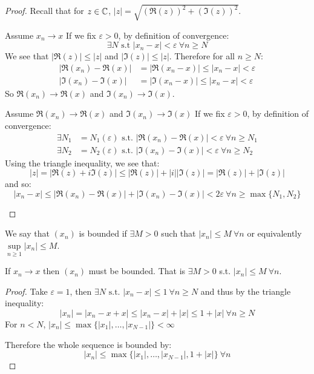 \documentclass[../main.tex]{subfiles}
\begin{document}
\begin{proof}
  Recall that for $z \in \mathbb{C}$, $|z| = \sqrt{(\Re(z))^2 + (\Im(z))^2}$.
  \begin{proofdirection}{Assume $x_n \to x$}
    If we fix $\varepsilon > 0$, by definition of convergence:
    \[
      \exists N \text{ s.t } |x_n - x| < \varepsilon\ \forall n \geq N
    \]
    We see that $|\Re(z)| \leq |z|$ and $|\Im(z)| \leq |z|$.
    Therefore for all $n \geq N$:
    \begin{align*}
      |\Re(x_n) - \Re(x)| &= |\Re(x_n - x)| \leq |x_n - x| < \varepsilon \\
      |\Im(x_n) - \Im(x)| &= |\Im(x_n - x)| \leq |x_n - x| < \varepsilon
    \end{align*}
    So $\Re(x_n) \to \Re(x)$ and $\Im(x_n) \to \Im(x)$.
  \end{proofdirection}
  \begin{proofdirection}{Assume $\Re(x_n) \to \Re(x)$ and $\Im(x_n) \to \Im(x)$}
    If we fix $\varepsilon > 0$, by definition of convergence:
    \begin{align*}
      \exists N_1 &= N_1(\varepsilon) \text{ s.t. } |\Re(x_n) - \Re(x)| < \varepsilon\ \forall n \geq N_1 \\
      \exists N_2 &= N_2(\varepsilon) \text{ s.t. } |\Im(x_n) - \Im(x)| < \varepsilon\ \forall n \geq N_2
    \end{align*}
    Using the triangle inequality, we see that:
    \[
      |z| = |\Re(z) + i \Im(z)| \leq |\Re(z)| + |i||\Im(z)| = |\Re(z)| + |\Im(z)|
    \]
    and so:
    \[
      |x_n - x| \leq |\Re(x_n) - \Re(x)| + |\Im(x_n) - \Im(x)| < 2\varepsilon\ \forall n \geq \max\{N_1, N_2\}
    \]
  \end{proofdirection}
\end{proof}
\begin{definition}
  We say that $(x_n)$ is bounded if $\exists M > 0$ such that $|x_n| \leq M\ \forall n$ or equivalently $\sup\limits_{n \geq 1} |x_n| \leq M$.
\end{definition}
\begin{lemma}
  If $x_n \to x$ then $(x_n)$ must be bounded.
  That is $\exists M > 0$ s.t. $|x_n| \leq M\ \forall n$.
  \label{convergenceBounded}
\end{lemma}
\begin{proof}
  Take $\varepsilon = 1$, then $\exists N \text{ s.t. } |x_n - x| \leq 1\ \forall n \geq N$ and thus by the triangle inequality:
  \[
    |x_n|  = |x_n - x + x| \leq |x_n - x| + |x| \leq 1 + |x|\ \forall n \geq N
  \]
  For $n < N$, $|x_n| \leq \max\{|x_1|, \ldots, |x_{N - 1}|\} < \infty$

  Therefore the whole sequence is bounded by:
  \[
    |x_n| \leq \max\{|x_1|, \ldots, |x_{N - 1}|, 1 + |x|\}\ \forall n
  \]
\end{proof}
\end{document}
